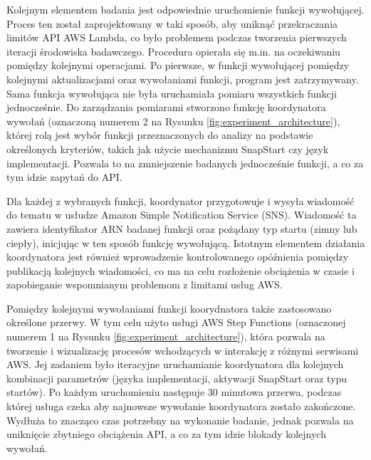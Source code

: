 Kolejnym elementem badania jest odpowiednie uruchomienie funkcji wywołującej.
Proces ten został zaprojektowany w taki sposób, aby uniknąć przekraczania limitów API AWS Lambda, co było problemem podczas tworzenia pierwszych iteracji środowiska badawczego.
Procedura opierała się m.in. na oczekiwaniu pomiędzy kolejnymi operacjami.
Po pierwsze, w funkcji wywołującej pomiędzy kolejnymi aktualizacjami oraz wywołaniami funkcji, program jest zatrzymywany.
Sama funkcja wywołująca nie była uruchamiała pomiaru wszystkich funkcji jednocześnie.
Do zarządzania pomiarami stworzono funkcję koordynatora wywołań (oznaczoną numerem 2 na Rysunku \ref{fig:experiment_architecture}), której rolą jest wybór funkcji przeznaczonych do analizy na podstawie określonych kryteriów, takich jak użycie mechanizmu SnapStart czy język implementacji.
Pozwala to na zmniejszenie badanych jednocześnie funkcji, a co za tym idzie zapytań do API.

Dla każdej z wybranych funkcji, koordynator przygotowuje i wysyła wiadomość do tematu w usłudze Amazon Simple Notification Service (SNS).
Wiadomość ta zawiera identyfikator ARN badanej funkcji oraz pożądany typ startu (zimny lub ciepły), inicjując w ten sposób funkcję wywołującą.
Istotnym elementem działania koordynatora jest również wprowadzenie kontrolowanego opóźnienia pomiędzy publikacją kolejnych wiadomości, co ma na celu rozłożenie obciążenia w czasie i zapobieganie wspomnianym problemom z limitami usług AWS.

Pomiędzy kolejnymi wywołaniami funkcji koorydnatora także zastosowano określone przerwy.
W tym celu użyto usługi AWS Step Functions (oznaczonej numerem 1 na Rysunku \ref{fig:experiment_architecture}), która pozwala na tworzenie i wizualizację procesów wchodzących w interakcję z różnymi serwisami AWS.
Jej zadaniem było iteracyjne uruchamianie koordynatora dla kolejnych kombinacji parametrów (języka implementacji, aktywacji SnapStart oraz typu startów).
Po każdym uruchomieniu następuje 30 minutowa przerwa, podczas której usługa czeka aby najnowsze wywołanie koordynatora zostało zakończone.
Wydłuża to znacząco czas potrzebny na wykonanie badanie, jednak pozwala na uniknięcie zbytniego obciążenia API, a co za tym idzie blokady kolejnych wywołań.

